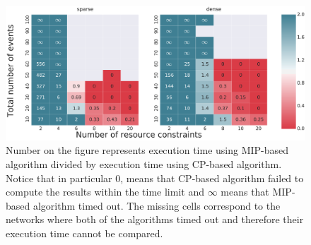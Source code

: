 \begin{figure}
\begin{center}
\includegraphics[width=\textwidth]{when_better}
\caption{Number on the figure represents execution time using MIP-based algorithm divided by execution time using CP-based algorithm. Notice that in particular $0$, means that CP-based algorithm failed to compute the results within the time limit and $\infty$ means that MIP-based algorithm timed out. The missing cells correspond to the networks where both of the algorithms timed out and therefore their execution time cannot be compared.   }
\label{fig:when_better}
\end{center}
\end{figure}

